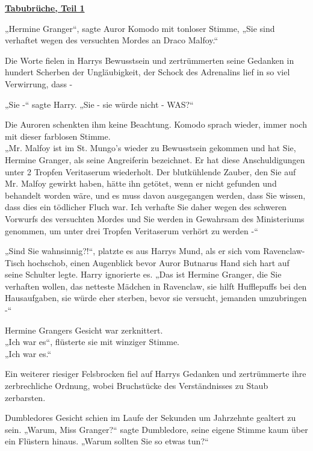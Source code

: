 

\hypertarget{tabubruxfcche-teil-1}{%

\textbf{\uline{Tabubrüche, Teil 1}}

\hfill\break „Hermine Granger“, sagte Auror Komodo mit tonloser Stimme, „Sie sind verhaftet wegen des versuchten Mordes an Draco Malfoy.“

Die Worte fielen in Harrys Bewusstsein und zertrümmerten seine Gedanken in hundert Scherben der Ungläubigkeit, der Schock des Adrenalins lief in so viel Verwirrung, dass -

„Sie -“ sagte Harry. „Sie - sie würde nicht - WAS?“

Die Auroren schenkten ihm keine Beachtung. Komodo sprach wieder, immer noch mit dieser farblosen Stimme.\\ „Mr. Malfoy ist im St. Mungo's wieder zu Bewusstsein gekommen und hat Sie, Hermine Granger, als seine Angreiferin bezeichnet. Er hat diese Anschuldigungen unter 2 Tropfen Veritaserum wiederholt. Der blutkühlende Zauber, den Sie auf Mr. Malfoy gewirkt haben, hätte ihn getötet, wenn er nicht gefunden und behandelt worden wäre, und es muss davon ausgegangen werden, dass Sie wissen, dass dies ein tödlicher Fluch war. Ich verhafte Sie daher wegen des schweren Vorwurfs des versuchten Mordes und Sie werden in Gewahrsam des Ministeriums genommen, um unter drei Tropfen Veritaserum verhört zu werden -“

„Sind Sie wahnsinnig?!“, platzte es aus Harrys Mund, als er sich vom Ravenclaw-Tisch hochschob, einen Augenblick bevor Auror Butnarus Hand sich hart auf seine Schulter legte. Harry ignorierte es. „Das ist Hermine Granger, die Sie verhaften wollen, das netteste Mädchen in Ravenclaw, sie hilft Hufflepuffs bei den Hausaufgaben, sie würde eher sterben, bevor sie versucht, jemanden umzubringen -“

Hermine Grangers Gesicht war zerknittert.\\ „Ich war es“, flüsterte sie mit winziger Stimme.\\ „Ich war es.“

Ein weiterer riesiger Felsbrocken fiel auf Harrys Gedanken und zertrümmerte ihre zerbrechliche Ordnung, wobei Bruchstücke des Verständnisses zu Staub zerbarsten.

Dumbledores Gesicht schien im Laufe der Sekunden um Jahrzehnte gealtert zu sein. „Warum, Miss Granger?“ sagte Dumbledore, seine eigene Stimme kaum über ein Flüstern hinaus. „Warum sollten Sie so etwas tun?“

}
